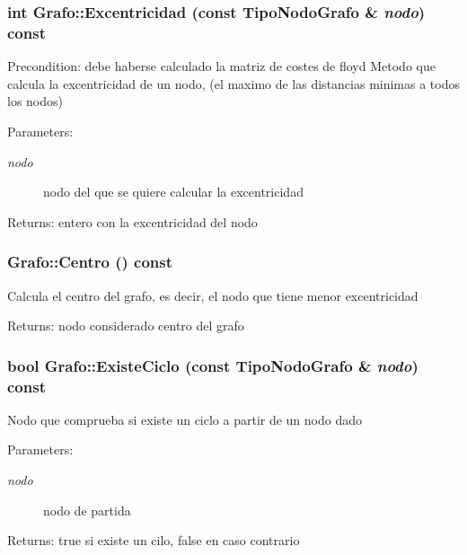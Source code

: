 \subsubsection{\setlength{\rightskip}{0pt plus 5cm}int Grafo::Excentricidad (const {\bf TipoNodoGrafo} \& {\em nodo}) const}\label{classGrafo_759e2bb306cf3830a2fdd66d6de1a62f}


\begin{Desc}
\item[Precondition:]debe haberse calculado la matriz de costes de floyd Metodo que calcula la excentricidad de un nodo, (el maximo de las distancias minimas a todos los nodos) \end{Desc}
\begin{Desc}
\item[Parameters:]
\begin{description}
\item[{\em nodo}]nodo del que se quiere calcular la excentricidad \end{description}
\end{Desc}
\begin{Desc}
\item[Returns:]entero con la excentricidad del nodo \end{Desc}
\subsubsection{ Grafo::Centro () const}\label{classGrafo_352046b0d3e115ac6e013657b4cead0e}


Calcula el centro del grafo, es decir, el nodo que tiene menor excentricidad \begin{Desc}
\item[Returns:]nodo considerado centro del grafo \end{Desc}
\subsubsection{\setlength{\rightskip}{0pt plus 5cm}bool Grafo::ExisteCiclo (const {\bf TipoNodoGrafo} \& {\em nodo}) const}\label{classGrafo_44b9f53140ae14ad60054104c105fc34}


Nodo que comprueba si existe un ciclo a partir de un nodo dado \begin{Desc}
\item[Parameters:]
\begin{description}
\item[{\em nodo}]nodo de partida \end{description}
\end{Desc}
\begin{Desc}
\item[Returns:]true si existe un cilo, false en caso contrario \end{Desc}
